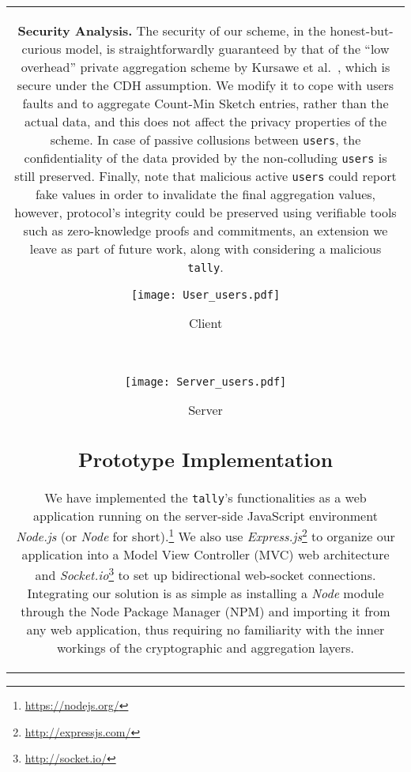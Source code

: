 \documentclass[conference]{IEEEtran}
\newcommand{\descr}[1]{\medskip \noindent \textbf{#1}}
\newcommand{\users}{{\tt users}\xspace}
\newcommand{\tally}{{\tt tally}\xspace}
\begin{document}
\begin{figure*}[ht!]
{\begin{tabular}{|c|}
\descr{Security Analysis.}
The security of our scheme, in the honest-but-curious model, is straightforwardly guaranteed by that of the ``low overhead'' private aggregation scheme by Kursawe et al.~\cite{Kursawe:2011}, which is secure under the CDH assumption.
We modify it
to cope with users faults and to aggregate Count-Min Sketch entries, rather than the actual data, and this does not affect the privacy properties of the scheme.
In case of passive collusions between \users, the confidentiality of the data provided by the non-colluding \users is still preserved.
Finally, note that malicious active \users could report fake values in order to invalidate the final aggregation values, however, protocol's integrity could be preserved using verifiable tools such as zero-knowledge proofs and commitments, an extension we leave as part of future work,
along with considering a malicious \tally.




\begin{figure*}[t]
\centering
    \begin{subfigure}[t]{0.4\textwidth}
        \centering
		\texttt{[image: User\_users.pdf]}
        \caption{\label{fig:time_client_users} Client}
    \end{subfigure} 
~
    \begin{subfigure}[t]{0.4\textwidth}
        \centering
		\texttt{[image: Server\_users.pdf]}
        \caption{\label{fig:time_server_users} Server}
    \end{subfigure}\vspace{-0.3cm}
\caption{\label{fig:time_users} Execution time  for increasing number of \users (with 700 programs).}
    \vspace{-0.4cm}
\end{figure*}



\subsection{Prototype Implementation}
\label{sec:implementation}


We have implemented the \tally's functionalities as a web application running on the server-side JavaScript environment \emph{Node.js} (or {\em Node} for short).\footnote{\url{https://nodejs.org/}} We also use \emph{Express.js}\footnote{\url{http://expressjs.com/}} 
to organize our application into a Model View Controller (MVC) web architecture and \emph{Socket.io}\footnote{\url{http://socket.io/}} to set up bidirectional web-socket connections.
Integrating our solution is as simple as installing a {\em Node} module through the Node Package Manager (NPM) and importing it from any web application,
thus requiring no familiarity with the inner workings of the cryptographic and aggregation layers. 



\end{tabular}}
\end{figure*}
\end{document}
